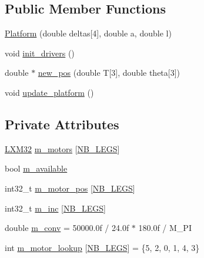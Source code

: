 \subsection*{Public Member Functions}
\begin{DoxyCompactItemize}
\item 
\hyperlink{classstp_1_1_platform_ae1c608918b3d7c2bb95cddaff580233a}{Platform} (double deltas\mbox{[}4\mbox{]}, double a, double l)
\item 
void \hyperlink{classstp_1_1_platform_a29151c99e9b53ff150f802a27c9c3eaa}{init\+\_\+drivers} ()
\item 
double $\ast$ \hyperlink{classstp_1_1_platform_af0ea4b19f21849974bb25b46d9276e84}{new\+\_\+pos} (double T\mbox{[}3\mbox{]}, double theta\mbox{[}3\mbox{]})
\item 
void \hyperlink{classstp_1_1_platform_ade3a53dd2234f57856b25dab957bae41}{update\+\_\+platform} ()
\end{DoxyCompactItemize}
\subsection*{Private Attributes}
\begin{DoxyCompactItemize}
\item 
\hyperlink{class_l_x_m32}{L\+X\+M32} \hyperlink{classstp_1_1_platform_a4cba8b9fff700a4f860ee8ef51e50124}{m\+\_\+motors} \mbox{[}\hyperlink{model_8hpp_ae44092ed043cb4350e2df47fdee890b9}{N\+B\+\_\+\+L\+E\+GS}\mbox{]}
\item 
bool \hyperlink{classstp_1_1_platform_a7a896535eaa53686f44f50d3dceee967}{m\+\_\+available}
\item 
int32\+\_\+t \hyperlink{classstp_1_1_platform_aad5d3ee79554303bbdc928183155f01b}{m\+\_\+motor\+\_\+pos} \mbox{[}\hyperlink{model_8hpp_ae44092ed043cb4350e2df47fdee890b9}{N\+B\+\_\+\+L\+E\+GS}\mbox{]}
\item 
int32\+\_\+t \hyperlink{classstp_1_1_platform_a8b8a183817a7536262e83e51edd4250a}{m\+\_\+inc} \mbox{[}\hyperlink{model_8hpp_ae44092ed043cb4350e2df47fdee890b9}{N\+B\+\_\+\+L\+E\+GS}\mbox{]}
\item 
double \hyperlink{classstp_1_1_platform_acd6fb6eda2c6606563ad2ba48fabff4b}{m\+\_\+conv} = 50000.\+0f / 24.\+0f $\ast$ 180.\+0f / M\+\_\+\+PI
\item 
int \hyperlink{classstp_1_1_platform_a5a13db3be1f7180271f5045905c2b5e3}{m\+\_\+motor\+\_\+lookup} \mbox{[}\hyperlink{model_8hpp_ae44092ed043cb4350e2df47fdee890b9}{N\+B\+\_\+\+L\+E\+GS}\mbox{]} = \{5, 2, 0, 1, 4, 3\}
\end{DoxyCompactItemize}
